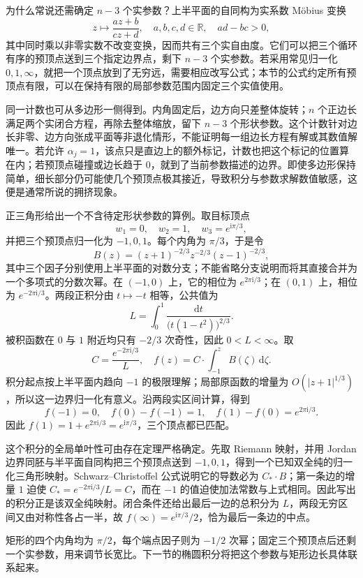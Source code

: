 \ProseParagraphBreak
为什么常说还需确定 \(n-3\) 个实参数？上半平面的自同构为实系数 Möbius 变换
\[
 z\longmapsto\frac{az+b}{cz+d},\quad
 a,b,c,d\in\mathbb R,\quad ad-bc>0,
\]
其中同时乘以非零实数不改变变换，因而共有三个实自由度。它们可以把三个循环有序的预顶点送到三个指定边界点，剩下 \(n-3\) 个实参数。若采用常见归一化 \(0,1,\infty\)，就把一个顶点放到了无穷远，需要相应改写公式；本节的公式约定所有预顶点有限，可以在保持有限的局部参数范围内固定三个实值使用。

\ProseParagraphBreak
同一计数也可从多边形一侧得到。内角固定后，边方向只差整体旋转；\(n\) 个正边长满足两个实闭合方程，再除去整体缩放，留下 \(n-3\) 个形状参数。这个计数针对边长非零、边方向张成平面等非退化情形，不能证明每一组边长方程有解或其数值解唯一。若允许 \(\alpha_j=1\)，该点只是直边上的额外标记，计数也把这个标记的位置算在内；若预顶点碰撞或边长趋于 \(0\)，就到了当前参数描述的边界。即使多边形保持简单，细长部分仍可能使几个预顶点极其接近，导致积分与参数求解数值敏感，这便是通常所说的拥挤现象。

\ProseParagraphBreak
正三角形给出一个不含待定形状参数的算例。取目标顶点
\[
 w_1=0,\quad w_2=1,\quad w_3=e^{\mathrm{i}\pi/3},
\]
并把三个预顶点归一化为 \(-1,0,1\)。每个内角为 \(\pi/3\)，于是令
\[
 B(z)=(z+1)^{-2/3}z^{-2/3}(z-1)^{-2/3},
\]
其中三个因子分别使用上半平面的对数分支；不能省略分支说明而将其直接合并为一个多项式的分数次幂。在 \((-1,0)\) 上，它的相位为 \(e^{2\pi\mathrm{i}/3}\)；在 \((0,1)\) 上，相位为 \(e^{-2\pi\mathrm{i}/3}\)。两段正积分由 \(t\mapsto-t\) 相等，公共值为
\[
 L=\int_0^1\frac{\mathrm{d}t}{\bigl(t(1-t^2)\bigr)^{2/3}}.
\]
被积函数在 \(0\) 与 \(1\) 附近均只有 \(-2/3\) 次奇性，因此 \(0<L<\infty\)。取
\[
 C=\frac{e^{-2\pi\mathrm{i}/3}}{L},\quad
 f(z)=C\cdot\int_{-1}^{z}B(\zeta)\,\mathrm{d}\zeta.
\]
积分起点按上半平面内趋向 \(-1\) 的极限理解；局部原函数的增量为 \(O(|z+1|^{1/3})\)，所以这一边界归一化有意义。沿两段实区间计算，得到
\[
 f(-1)=0,\quad f(0)-f(-1)=1,\quad
 f(1)-f(0)=e^{2\pi\mathrm{i}/3}.
\]
因此 \(f(1)=1+e^{2\pi\mathrm{i}/3}=e^{\mathrm{i}\pi/3}\)，三个顶点都已匹配。

\ProseParagraphBreak
这个积分的全局单叶性可由存在定理严格确定。先取 Riemann 映射，并用 Jordan 边界同胚与半平面自同构把三个预顶点送到 \(-1,0,1\)，得到一个已知双全纯的归一化三角形映射。Schwarz--Christoffel 公式说明它的导数必为 \(C_*\cdot B\)；第一条边的增量 \(1\) 迫使 \(C_*=e^{-2\pi\mathrm{i}/3}/L=C\)，而在 \(-1\) 的值迫使加法常数与上式相同。因此写出的积分正是该双全纯映射。闭合条件还给出最后一边的总积分为 \(L\)，两段无穷区间又由对称性各占一半，故 \(f(\infty)=e^{\mathrm{i}\pi/3}/2\)，恰为最后一条边的中点。

\ProseParagraphBreak
矩形的四个内角均为 \(\pi/2\)，每个端点因子则为 \(-1/2\) 次幂；固定三个预顶点后还剩一个实参数，用来调节长宽比。下一节的椭圆积分将把这个参数与矩形边长具体联系起来。
